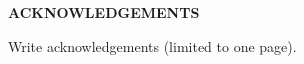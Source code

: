 \vspace*{1cm}
{\centering \textbf{ACKNOWLEDGEMENTS}\\[1.5cm]}

Write acknowledgements (limited to one page).
